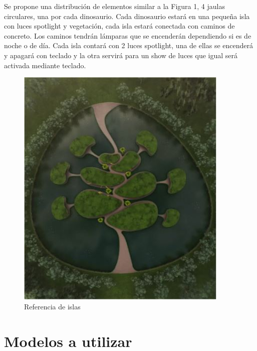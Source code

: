 \documentclass[12pt]{article} %
\begin{document}
	\setlength{\parindent}{1.0cm}
	Se propone una distribución de elementos similar a la Figura 1, 4 jaulas circulares, una por cada dinosaurio. 
	Cada dinosaurio estará en una pequeña isla con luces spotlight y vegetación, 
	cada isla estará conectada con caminos de concreto. 
	Los caminos tendrán lámparas que se encenderán dependiendo si es de noche o de día. 
	Cada isla contará con 2 luces spotlight, una de ellas se encenderá y apagará con teclado y la otra servirá para 
	un show de luces que igual será activada mediante teclado.
	\setlength{\parindent}{0.0cm}
	
	\begin{figure}[h]
		\begin{center}
			\includegraphics[scale=0.5]{images/Isla.JPG}
		\caption{Referencia de islas}
		\end{center}  		
	\end{figure}
	
	
	\newpage
	
	\section{Modelos a utilizar}
	
\end{document}
